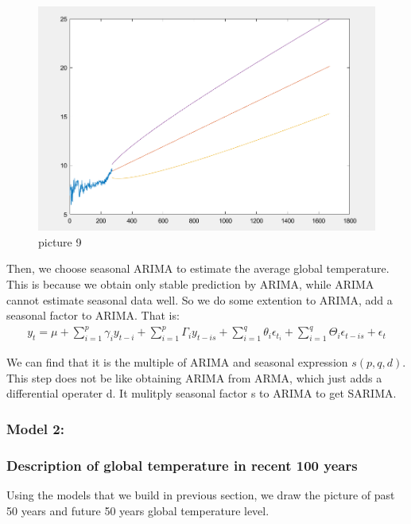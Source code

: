 \documentclass{apmcmthesis}
\begin{document}
\begin{figure}[htbp]
  \centering
  \includegraphics[scale=0.4]{ARIMA prediction 1400.png}
  \caption*{picture 9}\label{fig9}
\end{figure}


Then, we choose seasonal ARIMA to estimate the average global temperature.
This is because we obtain only stable prediction by ARIMA, while ARIMA cannot estimate seasonal data well.
So we do some extention to ARIMA, add a seasonal factor to ARIMA.
That is:
\begin{align*}
  y_t = \mu + \sum^p_{i=1} \gamma_i y_{t-i}  + \sum^p_{i=1} \Gamma_i y_{t-is} + \sum^q_{i=1} \theta_i \epsilon_{t_i} +  \sum^q_{i=1} \Theta_i \epsilon_{t-is} +\epsilon_t
\end{align*}

We can find that it is the multiple of ARIMA and seasonal expression $s(p,q,d)$.
This step does not be like obtaining ARIMA from ARMA, which just adds a differential operater d.
It mulitply seasonal factor s to ARIMA to get SARIMA.

\subsubsection{Model 2: }

\subsubsection{Description of global temperature in recent 100 years}
Using the models that we build in previous section, we draw the picture of past 50 years and future 50 years global temperature level.

 
\end{document}

